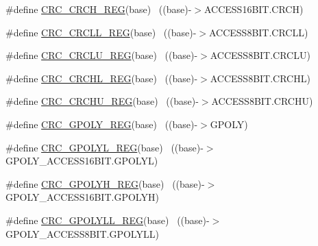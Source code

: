 \begin{DoxyCompactItemize}
\item 
\#define \hyperlink{group___c_r_c___register___accessor___macros_ga25a983be1195cec12e80bd5fd70d6bdb}{C\+R\+C\+\_\+\+C\+R\+C\+H\+\_\+\+R\+EG}(base)                                          ~((base)-\/$>$A\+C\+C\+E\+S\+S16\+B\+I\+T.\+C\+R\+CH)
\item 
\#define \hyperlink{group___c_r_c___register___accessor___macros_gadd29ee6c1be896d6a29e47087c6fc8c5}{C\+R\+C\+\_\+\+C\+R\+C\+L\+L\+\_\+\+R\+EG}(base)                                        ~((base)-\/$>$A\+C\+C\+E\+S\+S8\+B\+I\+T.\+C\+R\+C\+LL)
\item 
\#define \hyperlink{group___c_r_c___register___accessor___macros_gac563a3cd40ed051f1580525b3d997196}{C\+R\+C\+\_\+\+C\+R\+C\+L\+U\+\_\+\+R\+EG}(base)                                        ~((base)-\/$>$A\+C\+C\+E\+S\+S8\+B\+I\+T.\+C\+R\+C\+LU)
\item 
\#define \hyperlink{group___c_r_c___register___accessor___macros_ga89be07710e8d08250ca3b8dcbf6dd7ad}{C\+R\+C\+\_\+\+C\+R\+C\+H\+L\+\_\+\+R\+EG}(base)                                        ~((base)-\/$>$A\+C\+C\+E\+S\+S8\+B\+I\+T.\+C\+R\+C\+HL)
\item 
\#define \hyperlink{group___c_r_c___register___accessor___macros_ga4cf80e6cff3baf934f320fa9d78e3723}{C\+R\+C\+\_\+\+C\+R\+C\+H\+U\+\_\+\+R\+EG}(base)                                        ~((base)-\/$>$A\+C\+C\+E\+S\+S8\+B\+I\+T.\+C\+R\+C\+HU)
\item 
\#define \hyperlink{group___c_r_c___register___accessor___macros_ga4380a8ebc7eff991b5db31a826e12c34}{C\+R\+C\+\_\+\+G\+P\+O\+L\+Y\+\_\+\+R\+EG}(base)                                        ~((base)-\/$>$G\+P\+O\+LY)
\item 
\#define \hyperlink{group___c_r_c___register___accessor___macros_gab1698faf3a8970f99f403444ebb4d2c8}{C\+R\+C\+\_\+\+G\+P\+O\+L\+Y\+L\+\_\+\+R\+EG}(base)                                      ~((base)-\/$>$G\+P\+O\+L\+Y\+\_\+\+A\+C\+C\+E\+S\+S16\+B\+I\+T.\+G\+P\+O\+L\+YL)
\item 
\#define \hyperlink{group___c_r_c___register___accessor___macros_gafad4f84e32d790a7fe24cd92b2c480dd}{C\+R\+C\+\_\+\+G\+P\+O\+L\+Y\+H\+\_\+\+R\+EG}(base)                                      ~((base)-\/$>$G\+P\+O\+L\+Y\+\_\+\+A\+C\+C\+E\+S\+S16\+B\+I\+T.\+G\+P\+O\+L\+YH)
\item 
\#define \hyperlink{group___c_r_c___register___accessor___macros_gaf49775745cf42c0370512f2c0058acd7}{C\+R\+C\+\_\+\+G\+P\+O\+L\+Y\+L\+L\+\_\+\+R\+EG}(base)                                    ~((base)-\/$>$G\+P\+O\+L\+Y\+\_\+\+A\+C\+C\+E\+S\+S8\+B\+I\+T.\+G\+P\+O\+L\+Y\+LL)

\end{DoxyCompactItemize}
